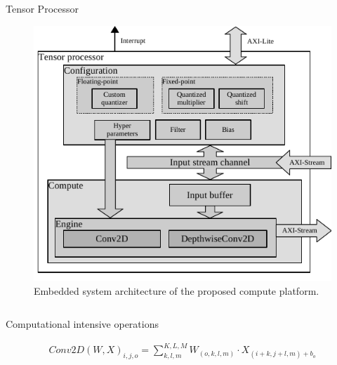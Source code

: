\documentclass[final]{beamer}
\newlength{\onecolwid}
\newlength{\twocolwid}
\begin{document}
\begin{frame}[t]
\begin{columns}[t]
\begin{column}{\twocolwid}
\begin{columns}[t,totalwidth=\twocolwid]
\begin{column}{\onecolwid}

\begin{block}{Tensor Processor}
	\begin{figure}
		\includegraphics[width=\linewidth]{../figures/accelerator.pdf}
		\caption{Embedded system architecture of the proposed compute platform.}
		\label{fig:conv_sys_design}
	\end{figure}

\end{block}


\end{column} %

\end{columns} %


\begin{alertblock}{Computational intensive operations}
	
\begin{eqnarray} \label{eq:conv2D}
Conv2D\left(W,X\right)_{i,j,o}=\sum_{k,l,m}^{K,L,M}W_{(o,k,l,m)} \cdot X_{(i+k,j+l,m)+b_{o}}
\end{eqnarray}



\end{alertblock}
\end{column}
\end{columns}
\end{frame}
\end{document}
